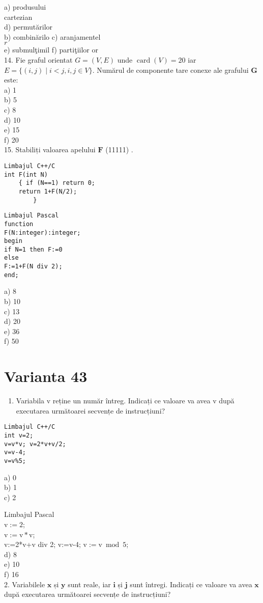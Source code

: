 a) produsului\\
cartezian\\
d) permutărilor\\
b) combinărilo c) aranjamentel\\
$r$\\
e) submulţimil f) partiţiilor or\\
14. Fie graful orientat $G=(V, E)$ unde $\operatorname{card}(V)=20$ iar $E=\{(i, j) \mid i<j, i, j \in V\}$. Numărul de componente tare conexe ale grafului $\mathbf{G}$ este:\\
a) 1\\
b) 5\\
c) 8\\
d) 10\\
e) 15\\
f) 20\\
15. Stabiliți valoarea apelului $\mathbf{F}$ (11111) .

\begin{verbatim}
Limbajul C++/C
int F(int N)
    { if (N==1) return 0;
    return 1+F(N/2);
        }
\end{verbatim}

\begin{verbatim}
Limbajul Pascal
function
F(N:integer):integer;
begin
if N=1 then F:=0
else
F:=1+F(N div 2);
end;
\end{verbatim}

a) 8\\
b) 10\\
c) 13\\
d) 20\\
e) 36\\
f) 50

\section*{Varianta 43}
\begin{enumerate}
  \item Variabila v reține un număr întreg. Indicați ce valoare va avea v după executarea următoarei secvențe de instrucțiuni?
\end{enumerate}

\begin{verbatim}
Limbajul C++/C
int v=2;
v=v*v; v=2*v+v/2;
v=v-4;
v=v%5;
\end{verbatim}

a) 0\\
b) 1\\
c) 2

Limbajul Pascal\\
$\mathrm{v}:=2$;\\
$\mathrm{v}:=\mathrm{v} * \mathrm{v}$;\\
v:=2*v+v div 2; v:=v-4; $\mathrm{v}:=\mathrm{v} \bmod 5$;\\
d) 8\\
e) 10\\
f) 16\\
2. Variabilele $\mathbf{x}$ și $\mathbf{y}$ sunt reale, iar $\mathbf{i}$ și $\mathbf{j}$ sunt întregi. Indicați ce valoare va avea $\mathbf{x}$ după executarea următoarei secvențe de instrucțiuni?

